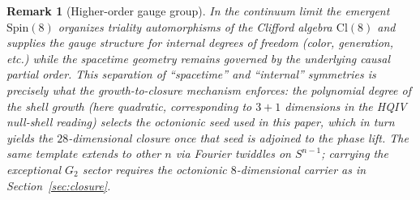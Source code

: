 \documentclass[11pt]{amsart}
\newtheorem{remark}[theorem]{Remark}
\begin{document}
\begin{remark}[Higher-order gauge group]
In the continuum limit the emergent \(\mathrm{Spin}(8)\) organizes triality automorphisms of the Clifford algebra \(\mathrm{Cl}(8)\) and supplies the gauge structure for internal degrees of freedom (color, generation, etc.) while the spacetime geometry remains governed by the underlying causal partial order. This separation of ``spacetime'' and ``internal'' symmetries is precisely what the growth-to-closure mechanism enforces: the polynomial degree of the shell growth (here quadratic, corresponding to \(3{+}1\) dimensions in the HQIV null-shell reading) selects the octonionic seed used in this paper, which in turn yields the \(28\)-dimensional closure once that seed is adjoined to the phase lift. The same \emph{template} extends to other \(n\) via Fourier twiddles on \(S^{n-1}\); carrying the exceptional \(G_2\) sector requires the octonionic \(8\)-dimensional carrier as in Section~\ref{sec:closure}.
\end{remark}
\end{document}

